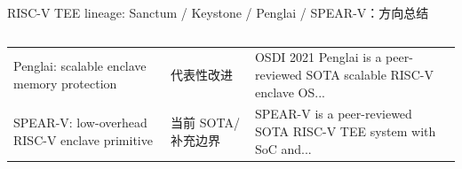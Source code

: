 \begin{frame}[t,shrink=6]{RISC-V TEE lineage: Sanctum / Keystone / Penglai / SPEAR-V：方向总结}
\begin{columns}[T,totalwidth=\textwidth]
\begin{column}{0.49\textwidth}
{\begin{minipage}[t]{0.97\linewidth}
\begin{minipage}{0.92\linewidth}
{\begin{tabularx}{\linewidth}{@{}YYY@{}}
Penglai: scalable enclave memory protection & 代表性改进 & OSDI 2021 Penglai is a peer-reviewed SOTA scalable RISC-V enclave OS... \\
SPEAR-V: low-overhead RISC-V enclave primitive & 当前 SOTA/补充边界 & SPEAR-V is a peer-reviewed SOTA RISC-V TEE system with SoC and... \\
\bottomrule
\end{tabularx}
}
    \end{minipage}
    \vspace{1mm}
  \end{minipage}}
  \end{column}
\end{columns}
\end{frame}
